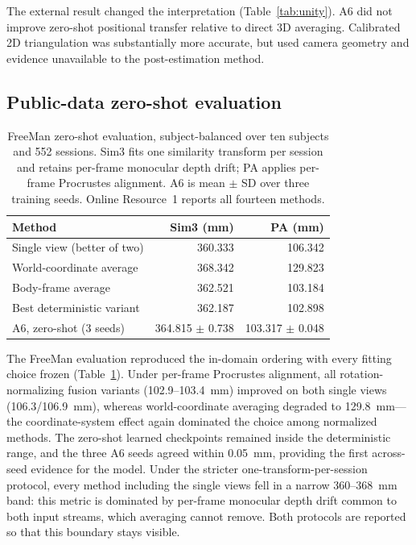 \documentclass[lineno,pdflatex,sn-mathphys-num]{sn-jnl}
\begin{document}
The external result changed the interpretation (Table~\ref{tab:unity}). A6 did
not improve zero-shot positional transfer relative to direct 3D averaging.
Calibrated 2D triangulation was substantially more accurate, but used camera
geometry and evidence unavailable to the post-estimation method.

\subsection{Public-data zero-shot evaluation}

\begin{table}[t]
\caption{FreeMan zero-shot evaluation, subject-balanced over ten subjects and
552 sessions. Sim3 fits one similarity transform per session and retains
per-frame monocular depth drift; PA applies per-frame Procrustes alignment.
A6 is mean $\pm$ SD over three training seeds. Online Resource~1 reports all
fourteen methods.}
\label{tab:freeman}
\centering
\small
\begin{tabular}{lrr}
\toprule
Method & Sim3 (mm) & PA (mm)\\
\midrule
Single view (better of two) & 360.333 & 106.342\\
World-coordinate average & 368.342 & 129.823\\
Body-frame average & 362.521 & 103.184\\
Best deterministic variant & 362.187 & 102.898\\
A6, zero-shot (3 seeds) & 364.815 $\pm$ 0.738 & 103.317 $\pm$ 0.048\\
\bottomrule
\end{tabular}
\end{table}

The FreeMan evaluation reproduced the in-domain ordering with every fitting
choice frozen (Table~\ref{tab:freeman}). Under per-frame Procrustes
alignment, all rotation-normalizing fusion variants (102.9--103.4~mm) improved
on both single views (106.3/106.9~mm), whereas world-coordinate averaging
degraded to 129.8~mm---the coordinate-system effect again dominated the choice
among normalized methods. The zero-shot learned checkpoints remained inside
the deterministic range, and the three A6 seeds agreed within 0.05~mm,
providing the first across-seed evidence for the model. Under the stricter
one-transform-per-session protocol, every method including the single views
fell in a narrow 360--368~mm band: this metric is dominated by per-frame
monocular depth drift common to both input streams, which averaging cannot
remove. Both protocols are reported so that this boundary stays visible.
\end{document}
